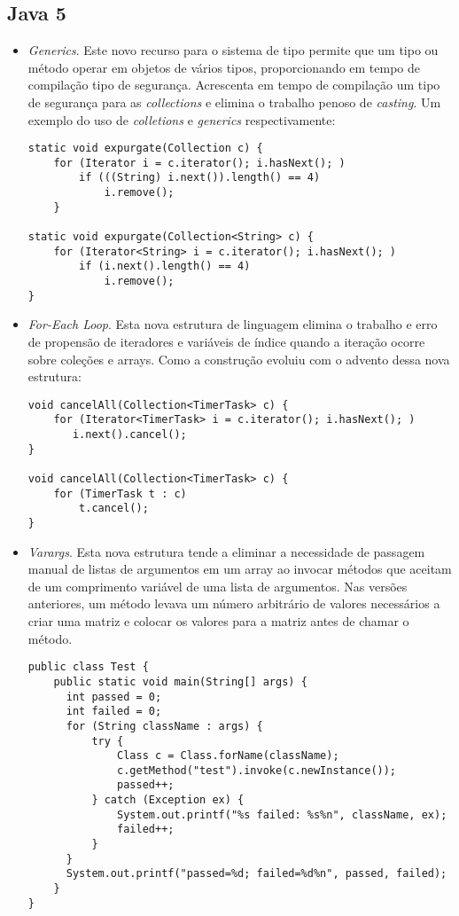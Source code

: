 	\subsection {Java 5}
	  \begin{itemize}
		  \item {\it Generics}\cite{JSE8_Enhancements}\cite{OracleGenerics}\cite{Parnin:2011:JGA:1985441.1985446}. Este novo recurso para o sistema de tipo permite que um tipo ou método operar em objetos de vários tipos, proporcionando em tempo de compilação tipo de segurança. Acrescenta em tempo de compilação um tipo de segurança para as {\it collections} e elimina o trabalho penoso de {\it casting}. Um exemplo do uso de {\it colletions} e {\it generics} respectivamente:
\begin{lstlisting}
static void expurgate(Collection c) {
	for (Iterator i = c.iterator(); i.hasNext(); )
		if (((String) i.next()).length() == 4)
			i.remove();
	}
	
static void expurgate(Collection<String> c) {
	for (Iterator<String> i = c.iterator(); i.hasNext(); )
		if (i.next().length() == 4)
			i.remove();
}
\end{lstlisting}
		  
		\item {\it For-Each Loop}. Esta nova estrutura de linguagem elimina o trabalho e erro de propensão de iteradores e variáveis de índice quando a iteração ocorre sobre coleções e arrays. Como a construção evoluiu com o advento dessa nova estrutura:
	
\begin{lstlisting}
void cancelAll(Collection<TimerTask> c) {
	for (Iterator<TimerTask> i = c.iterator(); i.hasNext(); )
	   i.next().cancel();
}
	
void cancelAll(Collection<TimerTask> c) {
	for (TimerTask t : c)
		t.cancel();
}
\end{lstlisting}
	  
	  \clearpage
	  \item {\it Varargs}. Esta nova estrutura tende a eliminar a necessidade de passagem manual de listas de argumentos em um array ao invocar métodos que aceitam de um comprimento variável de uma lista de argumentos. Nas versões anteriores, um método levava um número arbitrário de valores necessários a  criar uma matriz e colocar os valores para a matriz antes de chamar o método.


\begin{lstlisting}
public class Test {
	public static void main(String[] args) {
	  int passed = 0;
	  int failed = 0;
	  for (String className : args) {
	      try {
	          Class c = Class.forName(className);
	          c.getMethod("test").invoke(c.newInstance());
	          passed++;
	      } catch (Exception ex) {
	          System.out.printf("%s failed: %s%n", className, ex);
	          failed++;
	      }
	  }
	  System.out.printf("passed=%d; failed=%d%n", passed, failed);
	}
}
\end{lstlisting}
 

\end{itemize}
